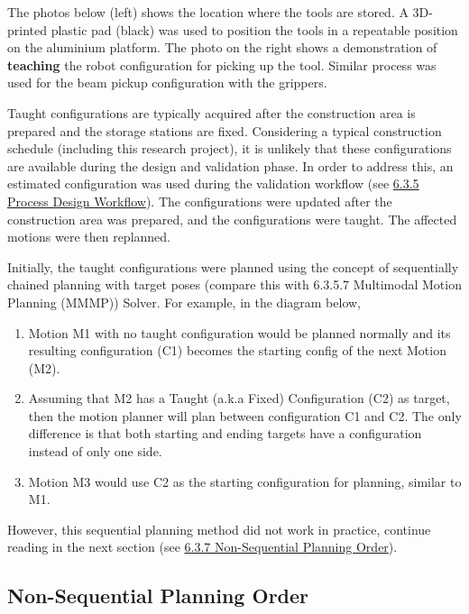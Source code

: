 The photos below (left) shows the location where the tools are stored. A 3D-printed plastic pad (black) was used to position the tools in a repeatable position on the aluminium platform. The photo on the right shows a demonstration of \textbf{teaching }the robot configuration for picking up the tool. Similar process was used for the beam pickup configuration with the grippers.




Taught configurations are typically acquired after the construction area is prepared and the storage stations are fixed. Considering a typical construction schedule (including this research project), it is unlikely that these configurations are available during the design and validation phase. In order to address this, an estimated configuration was used during the validation workflow (see \ul{6.3.5 Process Design Workflow}). The configurations were updated after the construction area was prepared, and the configurations were taught. The affected motions were then replanned.

Initially, the taught configurations were planned using the concept of sequentially chained planning with target poses (compare this with 6.3.5.7 Multimodal Motion Planning (MMMP)) Solver. For example, in the diagram below,

\begin{enumerate}
	\item Motion M1 with no taught configuration would be planned normally and its resulting configuration (C1) becomes the starting config of the next Motion (M2). 

	\item Assuming that M2 has a Taught (a.k.a Fixed) Configuration (C2) as target, then the motion planner will plan between configuration C1 and C2. The only difference is that both starting and ending targets have a configuration instead of only one side.

	\item Motion M3 would use C2 as the starting configuration for planning, similar to M1.

\end{enumerate}



However, this sequential planning method did not work in practice, continue reading in the next section (see \ul{6.3.7 Non-Sequential Planning Order}).

\subsection{Non-Sequential Planning Order}
\label{subsection:exploration_3_non_sequential_planning_order}

